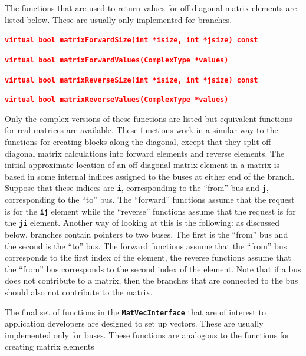 \documentclass[12pt]{report} %
\begin{document}
The functions that are used to return values for off-diagonal matrix elements are listed below. These are usually only implemented for branches.

\textcolor{red}{\texttt{\textbf{virtual bool matrixForwardSize(int *isize, int *jsize) const}}}


\textcolor{red}{\texttt{\textbf{virtual bool matrixForwardValues(ComplexType *values)}}}


\textcolor{red}{\texttt{\textbf{virtual bool matrixReverseSize(int *isize, int *jsize) const}}}


\textcolor{red}{\texttt{\textbf{virtual bool matrixReverseValues(ComplexType *values)}}}

Only the complex versions of these functions are listed but equivalent functions for real matrices are available. These functions work in a similar way to the functions for creating blocks along the diagonal, except that they split off-diagonal matrix calculations into forward elements and reverse elements. The initial approximate location of an off-diagonal matrix element in a matrix is based in some internal indices assigned to the buses at either end of the branch. Suppose that these indices are \texttt{\textbf{i}}, corresponding to the ``from'' bus and \texttt{\textbf{j}}, corresponding to the ``to'' bus. The ``forward'' functions assume that the request is for the \texttt{\textbf{ij}} element while the ``reverse'' functions assume that the request is for the \texttt{\textbf{ji}} element. Another way of looking at this is the following: as discussed below, branches contain pointers to two buses. The first is the ``from'' bus and the second is the ``to'' bus. The forward functions assume that the ``from'' bus corresponds to the first index of the element, the reverse functions assume that the ``from'' bus corresponds to the second index of the element. Note that if a bus does not contribute to a matrix, then the branches that are connected to the bus should also not contribute to the matrix.

The final set of functions in the \texttt{\textbf{MatVecInterface}} that are of interest to application developers are designed to set up vectors. These are usually implemented only for buses. These functions are analogous to the functions for creating matrix elements
\end{document}
